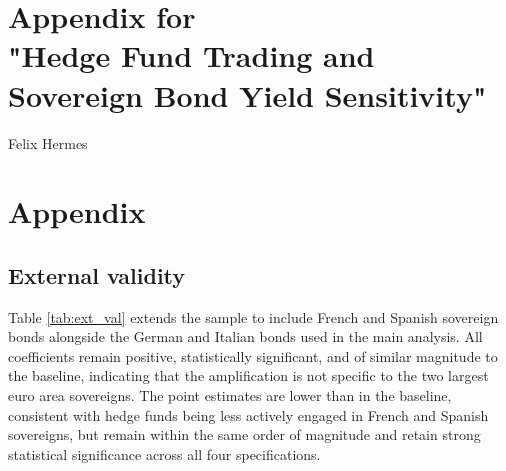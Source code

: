 \documentclass[english, 11pt, oneside]{article}
\renewcommand{\thesection}{\arabic{section}}
\renewcommand{\thesubsection}{\arabic{section}.\arabic{subsection}}
\renewcommand{\thetable}{\Roman{table}}
\begin{document}
\clearpage



\clearpage
\section*{Appendix for \\
"Hedge Fund Trading and Sovereign Bond Yield Sensitivity"}
\begin{center}
    
\large Felix Hermes
\end{center}

\vspace{2cm}


\renewcommand{\thepage}{A -- \arabic{page}}
\setcounter{page}{1}

\setcounter{section}{0}
\setcounter{subsection}{0}

\renewcommand{\thesection}{\Alph{section}}
\renewcommand{\thesubsection}{\thesection\arabic{subsection}}

\setcounter{equation}{0}
\renewcommand{\theequation}{\thesection.\arabic{equation}}

\renewcommand\thetable{\Alph{section}\arabic{table}} \setcounter{table}{0}
\renewcommand\thefigure{\Alph{section}\arabic{figure}} \setcounter{figure}{0}


\clearpage
\section{Appendix}
\label{sec:appendix}
\setcounter{figure}{0} 
\setcounter{table}{0}


\subsection{External validity}
\label{subsec:ext_val}

Table \ref{tab:ext_val} extends the sample to include French and Spanish sovereign bonds alongside the German and Italian bonds used in the main analysis. All coefficients remain positive, statistically significant, and of similar magnitude to the baseline, indicating that the amplification is not specific to the two largest euro area sovereigns. The point estimates are lower than in the baseline, consistent with hedge funds being less actively engaged in French and Spanish sovereigns, but remain within the same order of magnitude and retain strong statistical significance across all four specifications. \\
\end{document}
